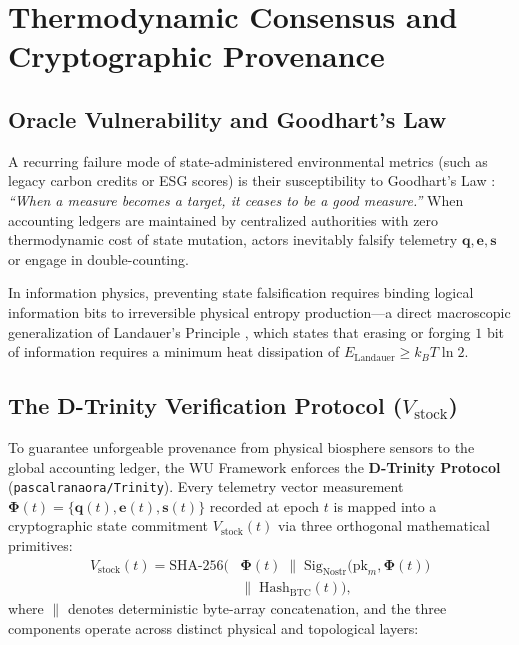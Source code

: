 \documentclass[aps,pre,twocolumn,10pt,superscriptaddress,amsmath,amssymb,amsfonts,floatfix,showkeys]{revtex4-2}
\begin{document}
\section{Thermodynamic Consensus and Cryptographic Provenance}

\subsection{Oracle Vulnerability and Goodhart's Law}

A recurring failure mode of state-administered environmental metrics (such as legacy carbon credits or ESG scores) is their susceptibility to Goodhart's Law \cite{Goodhart1975}: \textit{``When a measure becomes a target, it ceases to be a good measure.''} When accounting ledgers are maintained by centralized authorities with zero thermodynamic cost of state mutation, actors inevitably falsify telemetry $\bm{q}, \bm{e}, \bm{s}$ or engage in double-counting.

In information physics, preventing state falsification requires binding logical information bits to irreversible physical entropy production---a direct macroscopic generalization of Landauer's Principle \cite{Landauer1961, Bennett1982}, which states that erasing or forging $1$ bit of information requires a minimum heat dissipation of $E_{\text{Landauer}} \ge k_B T \ln 2$.

\subsection{The D-Trinity Verification Protocol (\texorpdfstring{$V_{\text{stock}}$}{Vstock})}

To guarantee unforgeable provenance from physical biosphere sensors to the global accounting ledger, the WU Framework enforces the \textbf{D-Trinity Protocol} (\texttt{pascalranaora/Trinity}). Every telemetry vector measurement $\bm{\Phi}(t) = \{\bm{q}(t), \bm{e}(t), \bm{s}(t)\}$ recorded at epoch $t$ is mapped into a cryptographic state commitment $V_{\text{stock}}(t)$ via three orthogonal mathematical primitives:
\begin{equation}
\begin{aligned}
    V_{\text{stock}}(t) = \text{SHA-256}\Big( &\bm{\Phi}(t) \;\parallel\; \text{Sig}_{\text{Nostr}}\big(\text{pk}_m, \bm{\Phi}(t)\big) \\
    &\parallel\; \text{Hash}_{\text{BTC}}(t) \Big),
\end{aligned}
\label{eq:d_trinity}
\end{equation}
where $\parallel$ denotes deterministic byte-array concatenation, and the three components operate across distinct physical and topological layers:
\end{document}
